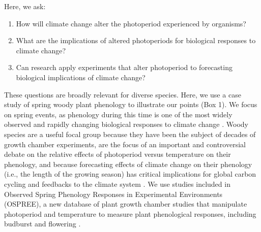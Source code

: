 \documentclass{article}
\begin{document}
\par Here, we ask: 
\begin{enumerate}
\item How will climate change alter the photoperiod experienced by organisms? 
\item What are the implications of altered photoperiods for biological responses to climate change?
\item Can research apply experiments that alter photoperiod to forecasting biological implications of climate change?

\end{enumerate} %
\par These questions are broadly relevant for diverse species. Here, we use a case study of spring woody plant phenology to illustrate our points (Box 1). We focus on spring events, as phenology during this time is one of the most widely observed and rapidly changing biological responses to climate change \citep{parmesan2006}. Woody species are a useful focal group because they have been the subject of decades of growth chamber experiments, are the focus of an important and controversial debate on the relative effects of photoperiod versus temperature on their phenology, and because forecasting effects of climate change on their phenology (i.e., the length of the growing season) has critical implications for global carbon cycling and feedbacks to the climate system \citep{richardson2013}. We use studies included in Observed Spring Phenology Responses in Experimental Environments (OSPREE), a new database of plant growth chamber studies that manipulate photoperiod and temperature to measure plant phenological responses, including budburst and flowering \citep{wolkovich2019}.%
\end{document}
